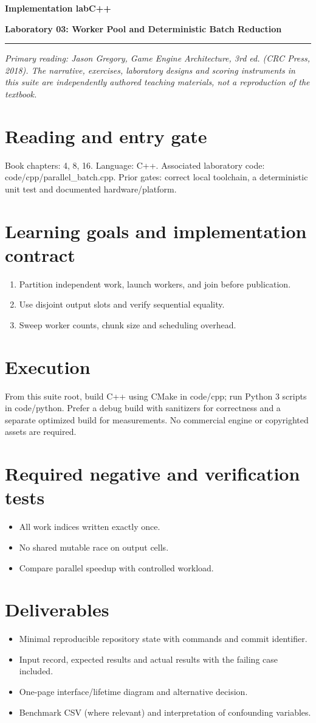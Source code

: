 \documentclass[11pt,letterpaper]{article}
\newcommand{\DocType}{Reference}
\newcommand{\SuiteHeading}[3]{%
\renewcommand{\DocType}{#2}%
{\small\bfseries\sffamily\color{EngineTeal}#2\hfill #3}\par\vspace{6pt}
{\LARGE\bfseries\color{EngineBlue}#1}\par\vspace{4pt}
{\color{EngineTeal}\rule{\linewidth}{1pt}}\par\vspace{7pt}}
\newcommand{\SourceNote}{\footnotesize\textit{Primary reading: Jason Gregory, \emph{Game Engine Architecture}, 3rd ed. (CRC Press, 2018). The narrative, exercises, laboratory designs and scoring instruments in this suite are independently authored teaching materials, not a reproduction of the textbook.}\normalsize\par}
\begin{document}
\SuiteHeading{Laboratory 03: Worker Pool and Deterministic Batch Reduction}{Implementation lab}{C++}
\SourceNote
\section{Reading and entry gate}
Book chapters: 4, 8, 16. Language: C++. Associated laboratory code: code/cpp/parallel\_batch.cpp. Prior gates: correct local toolchain, a deterministic unit test and documented hardware/platform.

\section{Learning goals and implementation contract}
\begin{enumerate}
\item Partition independent work, launch workers, and join before publication.
\item Use disjoint output slots and verify sequential equality.
\item Sweep worker counts, chunk size and scheduling overhead.
\end{enumerate}
\section{Execution}
From this suite root, build C++ using CMake in code/cpp; run Python 3 scripts in code/python. Prefer a debug build with sanitizers for correctness and a separate optimized build for measurements. No commercial engine or copyrighted assets are required.

\section{Required negative and verification tests}
\begin{itemize}
\item All work indices written exactly once.
\item No shared mutable race on output cells.
\item Compare parallel speedup with controlled workload.
\end{itemize}
\section{Deliverables}
\begin{itemize}
\item Minimal reproducible repository state with commands and commit identifier.
\item Input record, expected results and actual results with the failing case included.
\item One-page interface/lifetime diagram and alternative decision.
\item Benchmark CSV (where relevant) and interpretation of confounding variables.
\end{itemize}
\end{document}
